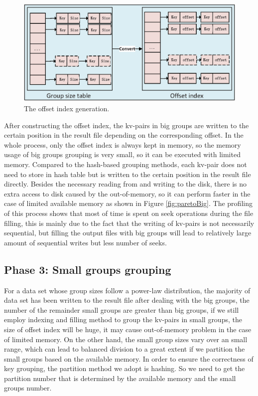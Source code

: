 \begin{figure}
\includegraphics[width=.48\textwidth]{fig/convert}
\caption{The offset index generation.}
\label{fig:convert}
\end{figure}


 
After constructing the offset index, the kv-pairs in big groups are written to the certain position in the result file depending on the corresponding offset. In the whole process, only the offset index is always kept in memory, so the memory usage of big groups grouping is very small, so it can be executed with limited memory. Compared to the hash-based grouping methods, each kv-pair does not need to store in hash table but is written to the certain position in the result file directly. Besides the necessary reading from and writing to the disk, there is no extra access to disk caused by the out-of-memory, so it can perform faster in the case of limited available memory as shown in Figure \ref{fig:paretoBig}. The profiling of this process shows that most of time is spent on seek operations during the file filling, this is mainly due to the fact that the writing of kv-pairs is not necessarily sequential, but filling the output files with big groups will lead to relatively large amount of sequential writes but less number of seeks.

\subsection{Phase 3: Small groups grouping}

For a data set whose group sizes follow a power-law distribution, the majority of data set has been written to the result file after dealing with the big groups, the number of the remainder small groups are greater than big groups, if we still employ indexing and filling method to group the kv-pairs in small groups, the size of offset index will be huge, it may cause out-of-memory problem in the case of limited memory. On the other hand, the small group sizes vary over an small range, which can lead to balanced division to a great extent if we partition the small groups based on the available memory. In order to ensure the correctness of key grouping, the partition method we adopt is hashing. So we need to get the partition number that is determined by the available memory and the small groups number. 

